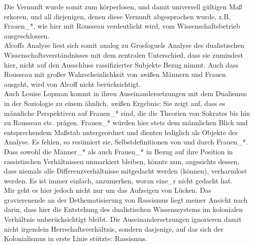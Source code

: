Die Vernunft wurde somit zum körperlosen, und damit universell gültigen Maß
erkoren, und all diejenigen, denen diese Vernunft abgesprochen wurde, z.B.
Frauen\_*, wie hier mit Rousseau verdeutlicht wird, vom Wissenschaftsbetrieb
ausgeschlossen. \\
Alcoffs Analyse liest sich somit analog zu Grosfoguels Analyse
des dualistischen Wissenschaftsverständnisses mit dem zentralen Unterschied,
dass sie zumindest hier, nicht auf den Ausschluss rassifizierter Subjekte Bezug
nimmt. Auch dass Rousseau mit großer Wahrscheinlichkeit von \textit{w}eißen Männern und
Frauen ausgeht, wird von Alcoff nicht berücksichtigt.\\ 

Auch Louise Lopman kommt in
ihren Auseinandersetzungen mit dem Dualismus in der Soziologie zu einem
ähnlich, \textit{w}eißen Ergebnis: Sie zeigt auf, dass es männliche Perspektiven auf
Frauen\_* sind, die die Theorien von Sokrates bis hin zu Rousseau etc. prägen.
Frauen\_* würden hier stets dem männlichen Blick und entsprechendem Maßstab
untergeordnet und dienten lediglich als Objekte der Analyse. Es fehlen, so
resümiert sie, Selbstdefinitionen von und durch Frauen\_*.\footnotemark
{} \\
Dass sowohl die
Männer\_* als auch Frauen\_* in Bezug auf ihre Position in rassistischen
Verhältnissen unmarkiert bleiben, könnte nun, angesichts dessen, dass niemals
alle Differenzverhältnisse mitgedacht werden (können), verharmlost werden. Es
ist immer einfach, anzumerken, woran eine\_r nicht gedacht hat.\\

\noindent Mir geht es hier jedoch nicht nur um das Aufzeigen von Lücken. Das gravierenende an
der Dethematisierung von Rassismus liegt meiner Ansicht nach darin, dass hier
die Entstehung des dualistischen Wissenssystems im kolonialen Verhältnis
unberücksichtigt bleibt. Die Auseinandersetzungen ignorieren damit nicht
irgendein Herrschaftsverhältnis, sondern dasjenige, auf das sich der
Kolonialismus in erste Linie stützte: Rassismus.\\

